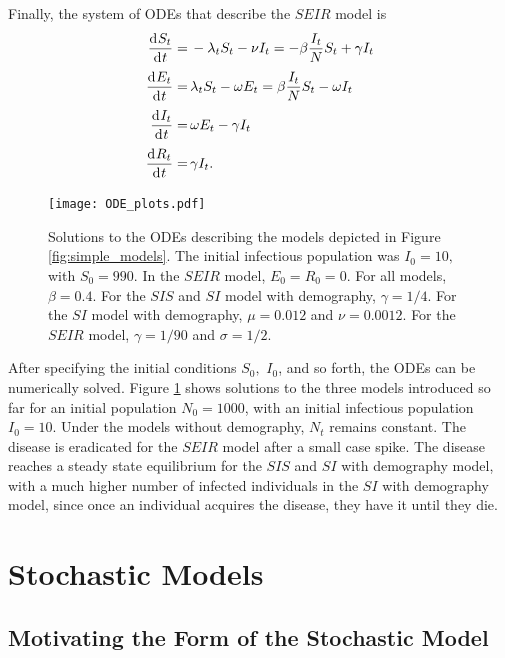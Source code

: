 Finally, the system of ODEs that describe the $SEIR$ model is \begin{align}
    \frac{\diff S_t}{\diff t}
    = & \, - \lambda_t S_t - \nu I_t
    = -\beta \frac{I_t}{N}S_t + \gamma I_t \label{eq:SEIR_1} \\
    \frac{\diff E_t}{\diff t}
    = & \, \lambda_t S_t - \omega E_t
    = \beta \frac{I_t}{N}S_t - \omega I_t \label{eq:SEIR_2}  \\
    \frac{\diff I_t}{\diff t}
    = & \, \omega E_t - \gamma I_t \label{eq:SEIR_3}         \\
    \frac{\diff R_t}{\diff t}
    = & \, \gamma I_t. \label{eq:SEIR_4}
\end{align}

\begin{figure}[htbp]
    \centering
    \texttt{[image: ODE\_plots.pdf]}
    \caption[{
        $SIS,$ $SI$ with demography, and $SEIR$ deterministic 
        ODE model simulations
    }]{
        Solutions to the ODEs describing the models
        depicted in Figure \ref{fig:simple_models}. The initial infectious
        population was $I_0 = 10,$ with $S_0 = 990.$ In the $SEIR$ model,
        $E_0 = R_0 = 0.$ For all models, $\beta = 0.4.$ For the $SIS$ and $SI$
        model with demography, $\gamma = 1/4.$ For the $SI$ model with
        demography, $\mu = 0.012$ and $\nu = 0.0012.$ For the $SEIR$ model,
        $\gamma = 1/90$ and $\sigma = 1/2.$
    }
    \label{fig:ODE_outputs}
\end{figure}

After specifying the initial conditions $S_0,$ $I_0$, and so forth,
the ODEs can be numerically solved. Figure \ref{fig:ODE_outputs} shows
solutions to the three models introduced so far for an initial population
$N_0 = 1000$, with an initial infectious population $I_0 = 10.$ Under the
models without demography, $N_t$ remains constant. The disease is eradicated
for the $SEIR$ model after a small case spike. The disease reaches a
steady state equilibrium for the $SIS$ and
$SI$ with demography model, with a much higher number of infected individuals
in the $SI$ with demography model, since once an individual acquires the
disease, they have it until they die.

\section{Stochastic Models}

\subsection*{Motivating the Form of the Stochastic Model}


